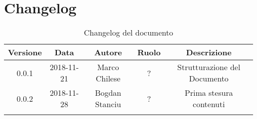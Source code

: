 \newpage

\section{Changelog}

\begin{center}
\begin{longtable}{|c|c|c|c|c|}
\hline
\textbf{Versione} & \textbf{Data} & \textbf{Autore} & \textbf{Ruolo} & \textbf{Descrizione} \\
\hline \hline
\endfirsthead
0.0.1 & 2018-11-21 & Marco Chilese & ? & Strutturazione del Documento \\
0.0.2 & 2018-11-28 & Bogdan Stanciu & ? & Prima stesura contenuti \\
\hline
\caption{Changelog del documento}
\end{longtable}
\end{center}
